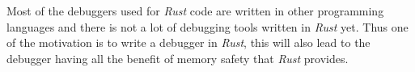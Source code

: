 Most of the debuggers used for \emph{Rust} code are written in other programming languages and there is not a lot of debugging tools written in \emph{Rust} yet.
Thus one of the motivation is to write a debugger in \emph{Rust}, this will also lead to the debugger having all the benefit of memory safety that \emph{Rust} provides.




